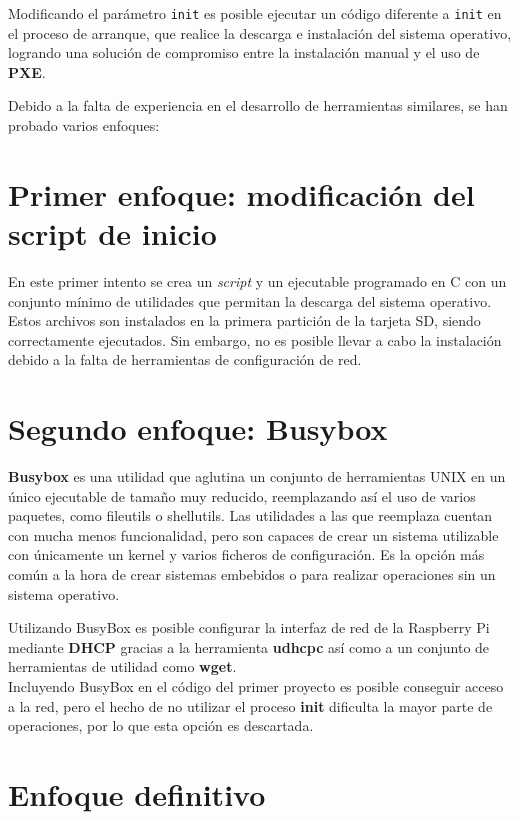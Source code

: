 \documentclass{article}
\begin{document}
Modificando el parámetro \texttt{init} es posible ejecutar un código diferente a \texttt{init} en el proceso de arranque, que realice la descarga e instalación del sistema operativo, logrando una solución de compromiso entre la instalación manual y el uso de \textbf{PXE}.

Debido a la falta de experiencia en el desarrollo de herramientas similares, se han probado varios enfoques:

\section{Primer enfoque: modificación del script de inicio}

En este primer intento se crea un \textit{script} y un ejecutable programado en C con un conjunto mínimo de utilidades que permitan la descarga del sistema operativo. Estos archivos son instalados en la primera partición de la tarjeta SD, siendo correctamente ejecutados. Sin embargo, no es posible llevar a cabo la instalación debido a la falta de herramientas de configuración de red.

\section{Segundo enfoque: Busybox}

\textbf{Busybox} es una utilidad que aglutina un conjunto de herramientas UNIX en un único ejecutable de tamaño muy reducido, reemplazando así el uso de varios paquetes, como fileutils o shellutils. Las utilidades a las que reemplaza cuentan con mucha menos funcionalidad, pero son capaces de crear un sistema utilizable con únicamente un kernel y varios ficheros de configuración\cite{aboutbusybox}. Es la opción más común a la hora de crear sistemas embebidos o para realizar operaciones sin un sistema operativo.

Utilizando BusyBox es posible configurar la interfaz de red de la Raspberry Pi mediante \textbf{DHCP} gracias a la herramienta \textbf{udhcpc} así como a un conjunto de herramientas de utilidad como \textbf{wget}.\\

Incluyendo BusyBox en el código del primer proyecto es posible conseguir acceso a la red, pero el hecho de no utilizar el proceso \textbf{init} dificulta la mayor parte de operaciones, por lo que esta opción es descartada.

\section{Enfoque definitivo}
\end{document}
